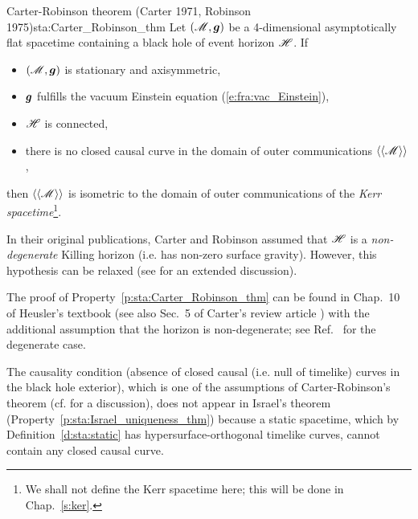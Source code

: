 \begin{tprop}{Carter-Robinson theorem
\textnormal{(Carter 1971, Robinson 1975)}}{sta:Carter_Robinson_thm}
Let $(\mathscr{M},\bm{g})$ be a 4-dimensional asymptotically flat spacetime
containing a black hole of event horizon $\mathscr{H}$. If
\begin{itemize}
\item $(\mathscr{M},\bm{g})$ is stationary and axisymmetric,
\item $\bm{g}$ fulfills the vacuum Einstein equation (\ref{e:fra:vac_Einstein}),
\item $\mathscr{H}$ is connected,
\item there is no closed causal curve in the domain of outer communications $\langle\langle \mathscr{M}\rangle\rangle$,
\end{itemize}
then $\langle\langle \mathscr{M}\rangle\rangle$ is isometric
to the domain of outer communications of the
\emph{Kerr spacetime}\footnote{We shall not define the Kerr spacetime here; this will be done in Chap.~\ref{s:ker}.}.
\end{tprop}

\begin{remark}
In their original publications, Carter \cite{Carte71} and Robinson \cite{Robin75} assumed
that $\mathscr{H}$ is a \emph{non-degenerate} Killing horizon (i.e. has non-zero surface gravity).
However, this hypothesis can be relaxed \cite{ChrusN10} (see \cite{ChrusLH12} for an
extended discussion).
\end{remark}

The proof of Property~\ref{p:sta:Carter_Robinson_thm}
can be found in Chap.~10 of Heusler's textbook \cite{Heusl96}
(see also Sec.~5 of Carter's review article \cite{Carte87}) with the additional
assumption that the horizon is non-degenerate; see
Ref.~\cite{ChrusN10} for the degenerate case.

\begin{remark}
The causality condition (absence of closed causal (i.e. null of timelike) curves in the black
hole exterior), which is one of the assumptions of Carter-Robinson's theorem
(cf. \cite{Carte99} for a discussion), does not appear in Israel's theorem
(Property~\ref{p:sta:Israel_uniqueness_thm}) because a static spacetime,
which by Definition~\ref{d:sta:static} has hypersurface-orthogonal timelike curves,
cannot contain any closed causal curve.
\end{remark}

